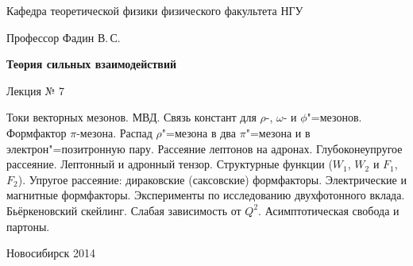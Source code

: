 \documentclass[12pt,pagesize,paper=landscape,paper=192mm:108mm]{scrbook}
\begin{document}
\begin{titlepage}
\begin{center}
    Кафедра теоретической физики физического факультета НГУ
    \medskip

    \Large
    Профессор Фадин В.\,С.

    \huge
    \textbf{Теория сильных взаимодействий}
    \smallskip
    
    \Large
    Лекция № 7
    \vfill
    
    \normalsize
    \begin{minipage}{0.78\linewidth}
      Токи векторных мезонов. МВД. Связь констант для $\rho$-,
      $\omega$- и $\phi$"=мезонов. Формфактор $\pi$-мезона. Распад
      $\rho$"=мезона в два $\pi$"=мезона и в электрон"=позитронную
      пару. Рассеяние лептонов на адронах. Глубоконеупругое
      рассеяние. Лептонный и адронный тензор. Структурные функции
      ($W_1$, $W_2$ и $F_1$, $F_2$). Упругое рассеяние: дираковские
      (саксовские) формфакторы. Электрические и магнитные
      формфакторы. Эксперименты по исследованию двухфотонного
      вклада. Бьёркеновский скейлинг. Слабая зависимость от
      $Q^2$. Асимптотическая свобода и партоны.
    \end{minipage}
    \vfill
    
    \normalsize \ccbysa\hspace{0.5em} Новосибирск 2014   
  \end{center}
\end{titlepage}
\end{document}
